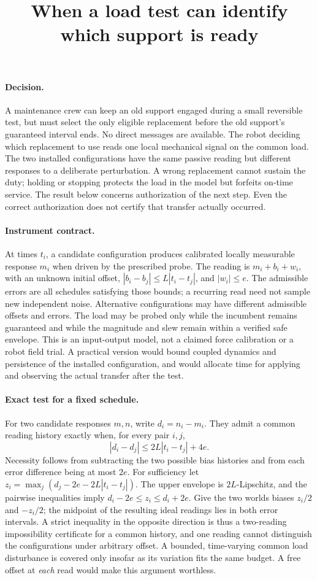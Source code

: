 \documentclass{article}
\title{When a load test can identify which support is ready}
\begin{document}
\maketitle
\paragraph{Decision.}
A maintenance crew can keep an old support engaged during a small reversible test, but must select the only eligible replacement before the old support's guaranteed interval ends. No direct messages are available. The robot deciding which replacement to use reads one local mechanical signal on the common load. The two installed configurations have the same passive reading but different responses to a deliberate perturbation. A wrong replacement cannot sustain the duty; holding or stopping protects the load in the model but forfeits on-time service. The result below concerns authorization of the next step. Even the correct authorization does not certify that transfer actually occurred.

\paragraph{Instrument contract.}
At times \(t_i\), a candidate configuration produces calibrated locally measurable response \(m_i\) when driven by the prescribed probe. The reading is \(m_i+b_i+w_i\), with an unknown initial offset, \(|b_i-b_j|\le L|t_i-t_j|\), and \(|w_i|\le e\). The admissible errors are all schedules satisfying those bounds; a recurring read need not sample new independent noise. Alternative configurations may have different admissible offsets and errors. The load may be probed only while the incumbent remains guaranteed and while the magnitude and slew remain within a verified safe envelope. This is an input-output model, not a claimed force calibration or a robot field trial. A practical version would bound coupled dynamics and persistence of the installed configuration, and would allocate time for applying and observing the actual transfer after the test.

\paragraph{Exact test for a fixed schedule.}
For two candidate responses \(m,n\), write \(d_i=n_i-m_i\). They admit a common reading history exactly when, for every pair \(i,j\),
\[
      |d_i-d_j|\le 2L|t_i-t_j|+4e .
\]
Necessity follows from subtracting the two possible bias histories and from each error difference being at most \(2e\). For sufficiency let
\(z_i=\max_j(d_j-2e-2L|t_i-t_j|)\).
The upper envelope is \(2L\)-Lipschitz, and the pairwise inequalities imply \(d_i-2e\le z_i\le d_i+2e\). Give the two worlds biases \(z_i/2\) and \(-z_i/2\); the midpoint of the resulting ideal readings lies in both error intervals. A strict inequality in the opposite direction is thus a two-reading impossibility certificate for a common history, and one reading cannot distinguish the configurations under arbitrary offset. A bounded, time-varying common load disturbance is covered only insofar as its variation fits the same budget. A free offset at \emph{each} read would make this argument worthless.
\end{document}
